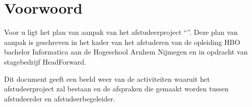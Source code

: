 \chapter{Voorwoord}
Voor u ligt het plan van aanpak van het afstudeerproject ``\thesisTitle''. Deze plan van aanpak is geschreven in het kader van het afstuderen van de opleiding HBO bachelor Informatica aan de Hogeschool Arnhem Nijmegen en in opdracht van stagebedrijf HeadForward.\par
Dit document geeft een beeld weer van de activiteiten waaruit het afstudeerproject zal bestaan en de afspraken die gemaakt worden tussen afstudeerder en afstudeerbegeleider.